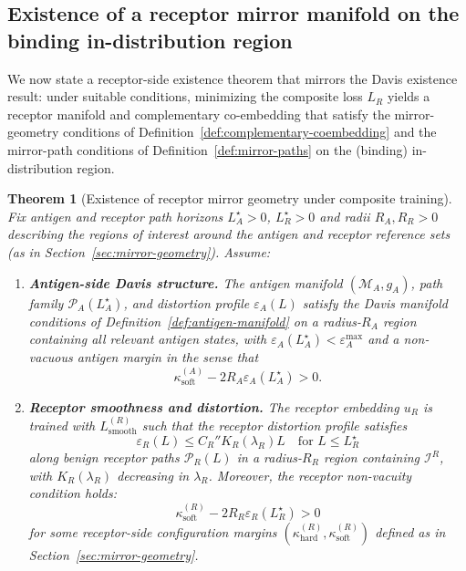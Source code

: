 \documentclass[11pt]{article}
\newcommand{\Ical}{\mathcal{I}}
\newcommand{\M}{\mathcal{M}}
\newcommand{\Pcal}{\mathcal{P}}
\newtheorem{theorem}{Theorem}
\begin{document}
\subsection{Existence of a receptor mirror manifold on the binding in-distribution region}
\label{subsec:existence-R}

We now state a receptor-side existence theorem that mirrors the Davis
existence result: under suitable conditions, minimizing the composite loss
$L_R$ yields a receptor manifold and complementary co-embedding that satisfy
the mirror-geometry conditions of Definition~\ref{def:complementary-coembedding}
and the mirror-path conditions of Definition~\ref{def:mirror-paths} on the
(binding) in-distribution region.

\begin{theorem}[Existence of receptor mirror geometry under composite training]
\label{thm:receptor-existence}
Fix antigen and receptor path horizons $L_A^\star>0$, $L_R^\star>0$ and radii
$R_A,R_R>0$ describing the regions of interest around the antigen and receptor
reference sets (as in Section~\ref{sec:mirror-geometry}). Assume:

\begin{enumerate}
  \item[\textnormal{(1)}] \textbf{Antigen-side Davis structure.}
    The antigen manifold $(\M_A,g_A)$, path family $\Pcal_A(L_A^\star)$, and
    distortion profile $\varepsilon_A(L)$ satisfy the Davis manifold conditions
    of Definition~\ref{def:antigen-manifold} on a radius-$R_A$ region containing
    all relevant antigen states, with
    $\varepsilon_A(L_A^\star) < \varepsilon_A^{\max}$ and a non-vacuous antigen
    margin in the sense that
    \[
      \kappa_{\mathrm{soft}}^{(A)} - 2R_A \varepsilon_A(L_A^\star) > 0.
    \]

  \item[\textnormal{(2)}] \textbf{Receptor smoothness and distortion.}
    The receptor embedding $u_R$ is trained with $L_{\mathrm{smooth}}^{(R)}$
    such that the receptor distortion profile satisfies
    \[
      \varepsilon_R(L) \le C_R'' K_R(\lambda_R) L
      \quad\text{for } L \le L_R^\star
    \]
    along benign receptor paths $\Pcal_R(L)$ in a radius-$R_R$ region
    containing $\Ical^R$, with $K_R(\lambda_R)$ decreasing in $\lambda_R$.
    Moreover, the receptor non-vacuity condition holds:
    \[
      \kappa_{\mathrm{soft}}^{(R)} - 2 R_R \varepsilon_R(L_R^\star) > 0
    \]
    for some receptor-side configuration margins
    $(\kappa_{\mathrm{hard}}^{(R)},\kappa_{\mathrm{soft}}^{(R)})$ defined as in
    Section~\ref{sec:mirror-geometry}.


\end{enumerate}
\end{theorem}
\end{document}
